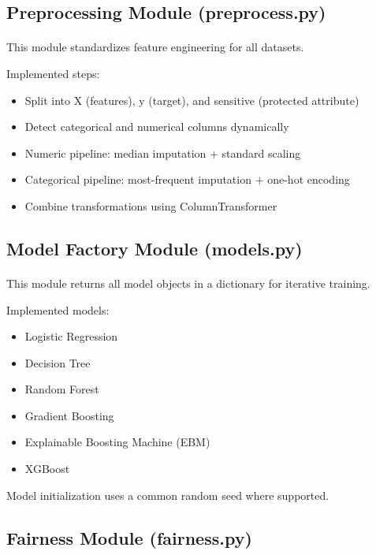 \subsection{Preprocessing Module (preprocess.py)}
\paragraph{}

This module standardizes feature engineering for all datasets.

Implemented steps:
\begin{itemize}
    \item Split into X (features), y (target), and sensitive (protected attribute)
    \item Detect categorical and numerical columns dynamically
    \item Numeric pipeline: median imputation + standard scaling
    \item Categorical pipeline: most-frequent imputation + one-hot encoding
    \item Combine transformations using ColumnTransformer
\end{itemize}

\subsection{Model Factory Module (models.py)}
\paragraph{}

This module returns all model objects in a dictionary for iterative training.

Implemented models:
\begin{itemize}
    \item Logistic Regression
    \item Decision Tree
    \item Random Forest
    \item Gradient Boosting
    \item Explainable Boosting Machine (EBM)
    \item XGBoost
\end{itemize}

Model initialization uses a common random seed where supported.

\subsection{Fairness Module (fairness.py)}
